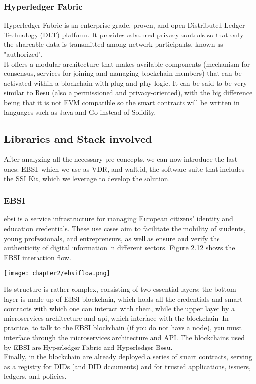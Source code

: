 \subsubsection{Hyperledger Fabric}
Hyperledger Fabric\cite{site:fabric} is an enterprise-grade, proven, and open Distributed Ledger 
Technology (DLT) platform. It provides advanced privacy controls so that only the shareable 
data is transmitted among network participants, known as "authorized".\\
It offers a modular architecture that makes available components (mechanism for 
consensus, services for joining and managing blockchain members) that can be activated
within a blockchain with plug-and-play logic. It can be said to be very similar to 
Besu (also a permissioned and privacy-oriented), with the big difference being that 
it is not EVM compatible so the smart contracts will be written in languages such as 
Java and Go instead of Solidity.
\subsection{Libraries and Stack involved}
After analyzing all the necessary pre-concepts, we can now introduce the last ones:
EBSI, which we use as VDR, and walt.id, the software suite that includes the SSI 
Kit, which we leverage to develop the solution.
\subsubsection{EBSI}
\acrfull{ebsi}\cite{site:ebsi} is a service infrastructure for 
managing European citizens' identity and education credentials. These use cases aim 
to facilitate the mobility of students, young professionals, and entrepreneurs, as 
well as ensure and verify the authenticity of digital information in different 
sectors. Figure 2.12 shows the EBSI interaction flow.
\begin{center}
    \texttt{[image: chapter2/ebsiflow.png]}
\end{center}
Its structure is rather complex, consisting of two essential layers: the bottom layer 
is made up of EBSI blockchain, which holds all the credentials and smart contracts 
with which one can interact with them, while the upper layer by a microservices 
architecture and \acrfull{api}, which interface with the 
blockchain. In practice, to talk to the EBSI blockchain (if you do not have a node), 
you must interface through the microservices architecture and API. The blockchains
used by EBSI are Hyperledger Fabric and Hyperledger Besu.\\
Finally, in the blockchain are already deployed a series of smart contracts, serving 
as a registry for DIDs (and DID documents) and for trusted applications, issuers, 
ledgers, and policies.
